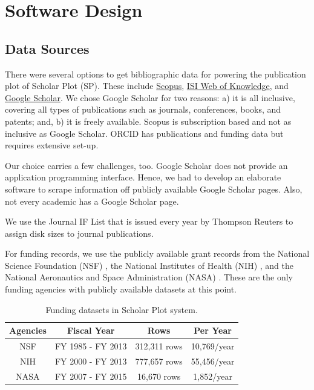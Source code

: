 \chapter{Software Design}\label{chap:Software Design}

\section{Data Sources}
There were several options to get bibliographic data for powering the publication plot of Scholar Plot (SP). These include \href{http://www.scopus.com/}{Scopus}, \href{http://www.isiknowledge.com/}{ISI Web of Knowledge}, and \href{http://scholar.google.com}{Google Scholar}. We chose Google Scholar for two reasons: a) it is all inclusive, covering all types of publications such as journals, conferences, books, and patents; and, b) it is freely available. Scopus is subscription based and not as inclusive as Google Scholar. ORCID has publications and funding data but requires extensive set-up.

Our choice carries a few challenges, too. Google Scholar does not provide an application programming interface. Hence, we had to develop an elaborate software to scrape information off publicly available Google Scholar pages. Also, not every academic has a Google Scholar page. %

We use the Journal IF List that is issued every year by Thompson Reuters to assign disk sizes to journal publications.

For funding records, we use the publicly available grant records from the National Science Foundation (NSF) \cite{nsf}, the National Institutes of Health (NIH) \cite{nih}, and the National Aeronautics and Space Administration (NASA) \cite{nasa}. These are the only funding agencies with publicly available datasets at this point.

\begin{table}[h!]
\centering
\begin{tabular}{||c c c c||}
 \hline
 Agencies & Fiscal Year & Rows & Per Year \\ [1ex]
 \hline\hline
 NSF & FY 1985 - FY 2013 & 312,311 rows & 10,769/year \\
 NIH & FY 2000 - FY 2013 & 777,657 rows & 55,456/year \\
 NASA & FY 2007 - FY 2015 & 16,670 rows & 1,852/year \\ [1ex]
 \hline
\end{tabular}
\caption{Funding datasets in Scholar Plot system.}
\label{table:1}
\end{table}










